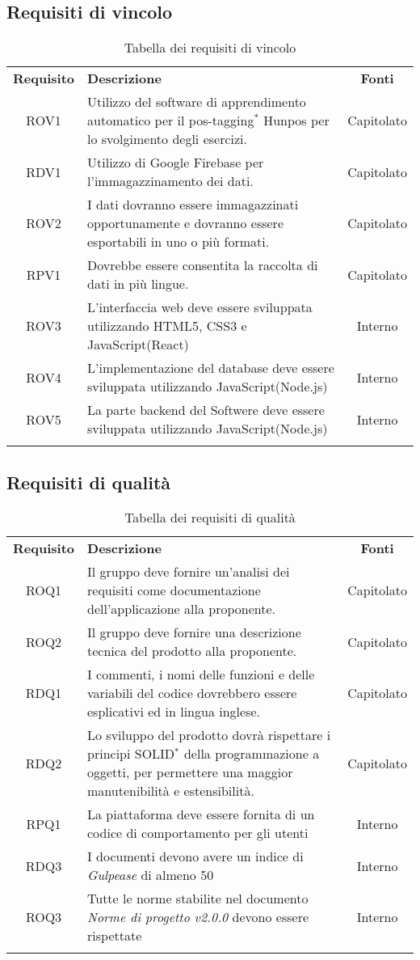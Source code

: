\subsection{Requisiti di vincolo}
\begin{longtable}{| c | p{10cm} | c |}
		\rowcolor{LightBlue}
		\color{white}\bfseries Requisito & \color{white}\bfseries Descrizione & \color{white}\bfseries Fonti\\[0.25cm]
		ROV1 & Utilizzo del software di apprendimento automatico per il pos-tagging$^*$ Hunpos per lo svolgimento degli esercizi. & Capitolato \\
		RDV1 & Utilizzo di Google Firebase per l'immagazzinamento dei dati. & Capitolato \\
		ROV2 & I dati dovranno essere immagazzinati opportunamente e dovranno essere esportabili in uno o più formati. & Capitolato \\
		RPV1 & Dovrebbe essere consentita la raccolta di dati in più lingue. & Capitolato \\ 
		ROV3 & L’interfaccia web deve essere sviluppata utilizzando HTML5, CSS3 e JavaScript(React) & Interno\\
		ROV4 & L'implementazione del database deve essere sviluppata utilizzando JavaScript(Node.js) & Interno\\
		ROV5 & La parte backend del Softwere deve essere sviluppata utilizzando JavaScript(Node.js) & Interno\\
		\hline
		\caption{Tabella dei requisiti di vincolo}
\end{longtable}

\subsection{Requisiti di qualità}
\begin{longtable}{| c | p{10cm} | c |}
		\rowcolor{LightBlue}
		\color{white}\bfseries Requisito & \color{white}\bfseries Descrizione & \color{white}\bfseries Fonti\\[0.25cm]
		ROQ1 & Il gruppo deve fornire un'analisi dei requisiti come documentazione dell'applicazione alla proponente. & Capitolato \\
		ROQ2 & Il gruppo deve fornire una descrizione tecnica del prodotto alla proponente. & Capitolato \\ 
		RDQ1 & I commenti, i nomi delle funzioni e delle variabili del codice dovrebbero essere esplicativi ed in lingua inglese. & Capitolato \\ 
		RDQ2 & Lo sviluppo del prodotto dovrà rispettare i principi SOLID$^*$ della programmazione a oggetti, per permettere una maggior manutenibilità e estensibilità. & Capitolato \\
		RPQ1 & La piattaforma deve essere fornita di un codice di comportamento per gli utenti & Interno\\
		RDQ3 & I documenti devono avere un indice di \textit{Gulpease} di almeno 50 & Interno\\
		ROQ3 & Tutte le norme stabilite nel documento \textit{Norme di progetto v2.0.0} devono essere rispettate & Interno\\
		\hline
		\caption{Tabella dei requisiti di qualità}
\end{longtable}
